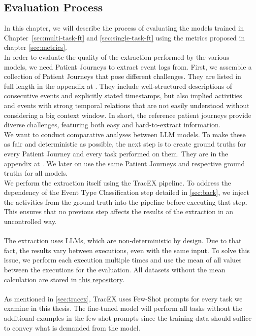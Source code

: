 \subsection{Evaluation Process}\label{sec:eval_process}
In this chapter, we will describe the process of evaluating the models trained in Chapter~\ref{sec:multi-task-ft} and \ref{sec:single-task-ft} using the metrics proposed in chapter \ref{sec:metrics}.\\
In order to evaluate the quality of the extraction performed by the various models, we need Patient Journeys to extract event logs from. First, we assemble a collection of Patient Journeys that pose different challenges. They are listed in full length in the appendix at . They include well-structured descriptions of consecutive events and explicitly stated timestamps, but also implied activities and events with strong temporal relations that are not easily understood without considering a big context window. In short, the reference patient journeys provide diverse challenges, featuring both easy and hard-to-extract information.\\
We want to conduct comparative analyses between LLM models. To make these as fair and deterministic as possible, the next step is to create ground truths for every Patient Journey and every task performed on them. They are in the appendix at . We later on use the same Patient Journeys and respective ground truths for all models.\\
We perform the extraction itself using the TracEX pipeline. To address the dependency of the Event Type Classification step detailed in \autoref{sec:back}, we inject the activities from the ground truth into the pipeline before executing that step. This ensures that no previous step affects the results of the extraction in an uncontrolled way.\\\\
The extraction uses LLMs, which are non-deterministic by design. Due to that fact, the results vary between executions, even with the same input. To solve this issue, we perform each execution multiple times and use the mean of all values between the executions for the evaluation. All datasets without the mean calculation are stored in \href{https://github.com/FR-SON/Bachelor-Thesis}{this repository}.\\\\
As mentioned in \autoref{sec:tracex}, TracEX uses Few-Shot prompts for every task we examine in this thesis. The fine-tuned model will perform all tasks without the additional examples in the few-shot prompts since the training data should suffice to convey what is demanded from the model.

